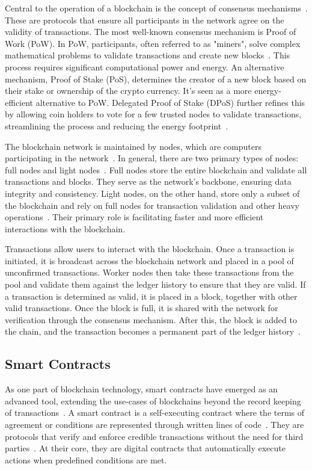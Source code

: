 Central to the operation of a blockchain is the concept of consensus mechanisms~\cite{Tahir.2022}. These are protocols that ensure all participants in the network agree on the validity of transactions. The most well-known consensus mechanism is Proof of Work (PoW). In PoW, participants, often referred to as "miners", solve complex mathematical problems to validate transactions and create new blocks~\cite{Kairaldeen.2021}. This process requires significant computational power and energy. An alternative mechanism, Proof of Stake (PoS), determines the creator of a new block based on their stake or ownership of the crypto currency. It's seen as a more energy-efficient alternative to PoW. Delegated Proof of Stake (DPoS) further refines this by allowing coin holders to vote for a few trusted nodes to validate transactions, streamlining the process and reducing the energy footprint~\cite{KUCHKOVSKY.2021}.

The blockchain network is maintained by nodes, which are computers participating in the network~\cite{Xiong.2022}. In general, there are two primary types of nodes: full nodes and light nodes~\cite{Mitra.2021}. Full nodes store the entire blockchain and validate all transactions and blocks. They serve as the network's backbone, ensuring data integrity and consistency. Light nodes, on the other hand, store only a subset of the blockchain and rely on full nodes for transaction validation and other heavy operations~\cite{Mitra.2021}. Their primary role is facilitating faster and more efficient interactions with the blockchain.

Transactions allow users to interact with the blockchain. Once a transaction is initiated, it is broadcast across the blockchain network and placed in a pool of unconfirmed transactions. Worker nodes then take these transactions from the pool and validate them against the ledger history to ensure that they are valid. If a transaction is determined as valid, it is placed in a block, together with other valid transactions. Once the block is full, it is shared with the network for verification through the consensus mechanism. After this, the block is added to the chain, and the transaction becomes a permanent part of the ledger history~\cite{Xiong.2022}.

\subsection{Smart Contracts}
As one part of blockchain technology, smart contracts have emerged as an advanced tool, extending the use-cases of blockchains beyond the record keeping of transactions~\cite{UchaniGutierrez.2023}. A smart contract is a self-executing contract where the terms of agreement or conditions are represented through written lines of code~\cite{Zhou.2022}. They are protocols that verify and enforce credible transactions without the need for third parties~\cite{Zhou.2022}. At their core, they are digital contracts that automatically execute actions when predefined conditions are met.

